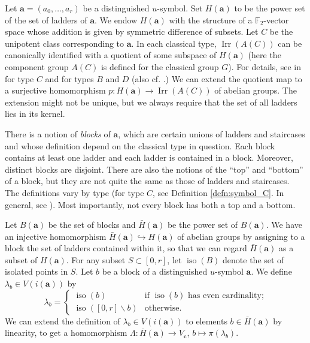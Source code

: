\documentclass{amsart}
\theoremstyle{definition}
\DeclareMathOperator{\Irr}{Irr}
\newcommand{\F}{\mathbb{F}}
\newcommand{\cG}{\mathcal{G}}
\newcommand{\ba}{\mathbf{a}}
\newcommand{\bc}{{\mathbf{c}}}
\newcommand{\Ab}{\bar{A}}
\newcommand{\Hb}{\bar{H}}
\newcommand{\0}{\mathcal{O}}
\begin{document}
Let $\ba = (a_0, \ldots, a_r)$ be a distinguished $u$-symbol. Set
$H(\ba)$ to be the power set of the set of ladders of $\ba$. We endow $H(\ba)$ with the structure of a $\F_2$-vector space whose addition is given by symmetric difference of subsets. 
Let $C$ be the unipotent class corresponding to $\ba$.  In each classical type, $\Irr(A(C))$
can be canonically identified with a quotient of some subspace of $H(\ba)$ (here the component group $A(C)$ is defined for the classical group $G$). For details, see  in \cite[\S 12]{Lusztig:icc} for type $C$ and \cite[\S 13]{Lusztig:icc} for types $B$ and $D$ (also cf. \cite[pp. 419--423]{Carter}.) We can extend the quotient map to a surjective homomorphism $p: H(\ba) \to \Irr(A(C))$ of abelian groups. %
The extension might not be unique, but we always require that the set of all ladders lies in its kernel.

There is a notion of \emph{blocks} of
$\ba$, which are certain unions of ladders and staircases and whose definition depend on the classical type in question.  Each block
contains at least one ladder and each ladder is contained in
a block.  Moreover, distinct blocks are disjoint.  
There are also the notions of the ``top'' and ``bottom'' of a block, but they are
not quite the same as those of ladders and staircases. The definitions vary by type (for type $C$, see Definition \ref{defn:symbol_C}. In general, see \cite[Section 4]{Achar-Sage-special}). 
Most importantly, not every block has both a top and a bottom.


Let $B(\ba)$ be the set of blocks and $\Hb(\ba)$ be the power set of
$B(\ba)$.  We have an injective homomorphism $\Hb(\ba) \hookrightarrow H(\ba)$ of abelian groups by assigning to a block the set of ladders contained within
it, so that we can regard $\Hb(\ba)$ as a subset of $H(\ba)$.  
For any subset $S \subset [0,r]$, let $\operatorname{iso}(B)$ denote the set of isolated points in $S$. Let $b$ be a block of a distinguished $u$-symbol $\ba$. We define $\lambda_b
\in V(i(\ba))$ by
\[
\lambda_b =
\begin{cases}
	\operatorname{iso}(b) &
	\text{if $\operatorname{iso}(b)$ has even cardinality;} \\
	\operatorname{iso}([0,r] \backslash b) &
	\text{otherwise.}
\end{cases}
\]
We can extend the definition of $\lambda_b \in V(i(\ba))$ to elements $b\in\Hb(\ba)$ by linearity, to get a homomorphism $\Lambda: \Hb(\ba) \to V_\bc$, $b \mapsto \pi(\lambda_b)$. 
\end{document}
